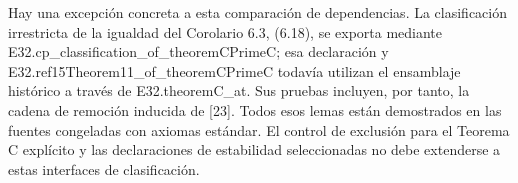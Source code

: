 \documentclass[spanish,11pt,a4paper]{article}
\begin{document}
Hay una excepción concreta a esta comparación de dependencias. La clasificación irrestricta de la igualdad del Corolario 6.3, (6.18), se exporta mediante {\ttfamily\small E32.\discretionary{\hbox{\ensuremath{\hookrightarrow}}}{}{}cp\_\discretionary{\hbox{\ensuremath{\hookrightarrow}}}{}{}classificati\discretionary{\hbox{\ensuremath{\hookrightarrow}}}{}{}on\_\discretionary{\hbox{\ensuremath{\hookrightarrow}}}{}{}of\_\discretionary{\hbox{\ensuremath{\hookrightarrow}}}{}{}theoremCPrim\discretionary{\hbox{\ensuremath{\hookrightarrow}}}{}{}eC}; esa declaración y {\ttfamily\small E32.\discretionary{\hbox{\ensuremath{\hookrightarrow}}}{}{}ref15Theorem\discretionary{\hbox{\ensuremath{\hookrightarrow}}}{}{}11\_\discretionary{\hbox{\ensuremath{\hookrightarrow}}}{}{}of\_\discretionary{\hbox{\ensuremath{\hookrightarrow}}}{}{}theoremCPrim\discretionary{\hbox{\ensuremath{\hookrightarrow}}}{}{}eC} todavía utilizan el ensamblaje histórico a través de {\ttfamily\small E32.\discretionary{\hbox{\ensuremath{\hookrightarrow}}}{}{}theoremC\_\discretionary{\hbox{\ensuremath{\hookrightarrow}}}{}{}at}. Sus pruebas incluyen, por tanto, la cadena de remoción inducida de {[}23{]}. Todos esos lemas están demostrados en las fuentes congeladas con axiomas estándar. El control de exclusión para el Teorema C explícito y las declaraciones de estabilidad seleccionadas no debe extenderse a estas interfaces de clasificación.
\end{document}
